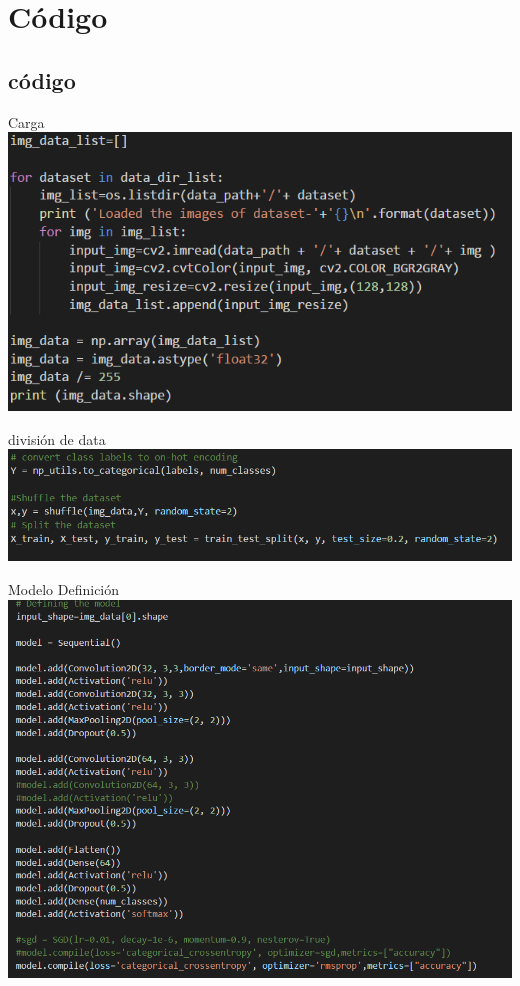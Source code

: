 \documentclass{beamer}
\begin{document}
\section{Código}

\subsection{código}

\begin{frame}{Carga}
\includegraphics[width=1.1\textwidth]{images/carga.png}
\end{frame}

\begin{frame}{división de data}
\includegraphics[width=1.1\textwidth]{images/division.png}
\end{frame}

\begin{frame}{Modelo Definición}
\includegraphics[width=1.1\textwidth]{images/definicion_modelo.png}
\end{frame}
\end{document}
